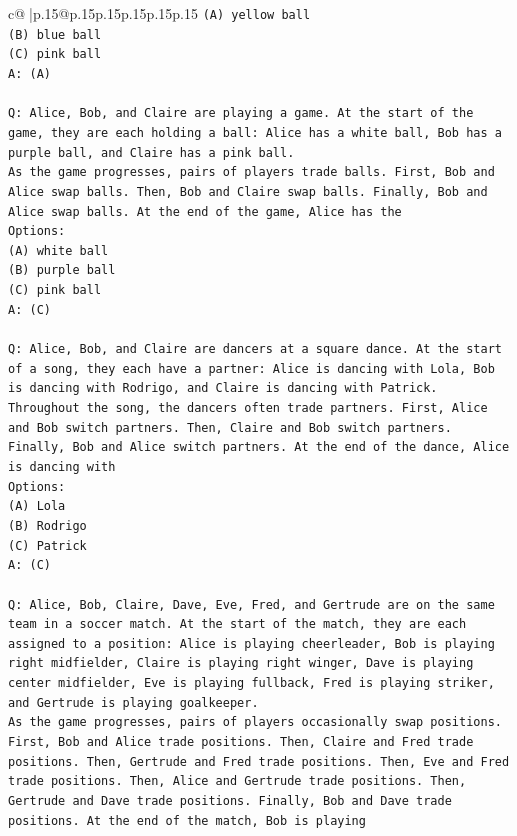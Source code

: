 \documentclass{article}
\begin{document}
{\begin{supertabular}{c@{$\;$}|p{.15\linewidth}@{}p{.15\linewidth}p{.15\linewidth}p{.15\linewidth}p{.15\linewidth}p{.15\linewidth}}
{{{\texttt{(A) yellow ball} \\
\texttt{(B) blue ball} \\
\texttt{(C) pink ball} \\
\texttt{A: (A)} \\
\\ 
\texttt{Q: Alice, Bob, and Claire are playing a game. At the start of the game, they are each holding a ball: Alice has a white ball, Bob has a purple ball, and Claire has a pink ball.} \\
\texttt{As the game progresses, pairs of players trade balls. First, Bob and Alice swap balls. Then, Bob and Claire swap balls. Finally, Bob and Alice swap balls. At the end of the game, Alice has the} \\
\texttt{Options:} \\
\texttt{(A) white ball} \\
\texttt{(B) purple ball} \\
\texttt{(C) pink ball} \\
\texttt{A: (C)} \\
\\ 
\texttt{Q: Alice, Bob, and Claire are dancers at a square dance. At the start of a song, they each have a partner: Alice is dancing with Lola, Bob is dancing with Rodrigo, and Claire is dancing with Patrick.} \\
\texttt{Throughout the song, the dancers often trade partners. First, Alice and Bob switch partners. Then, Claire and Bob switch partners. Finally, Bob and Alice switch partners. At the end of the dance, Alice is dancing with} \\
\texttt{Options:} \\
\texttt{(A) Lola} \\
\texttt{(B) Rodrigo} \\
\texttt{(C) Patrick} \\
\texttt{A: (C)} \\
\\ 
\texttt{Q: Alice, Bob, Claire, Dave, Eve, Fred, and Gertrude are on the same team in a soccer match. At the start of the match, they are each assigned to a position: Alice is playing cheerleader, Bob is playing right midfielder, Claire is playing right winger, Dave is playing center midfielder, Eve is playing fullback, Fred is playing striker, and Gertrude is playing goalkeeper.} \\
\texttt{As the game progresses, pairs of players occasionally swap positions. First, Bob and Alice trade positions. Then, Claire and Fred trade positions. Then, Gertrude and Fred trade positions. Then, Eve and Fred trade positions. Then, Alice and Gertrude trade positions. Then, Gertrude and Dave trade positions. Finally, Bob and Dave trade positions. At the end of the match, Bob is playing} \\
}}}
\end{supertabular}}
\end{document}
